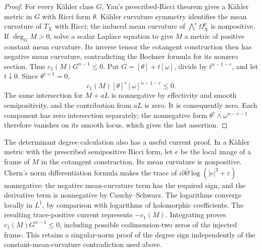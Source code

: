 \begin{proof}
For every Kähler class \(G\), Yau's prescribed-Ricci theorem
\cite{Yau1978} gives a Kähler metric in \(G\) with Ricci form \(\theta\).
Kähler curvature symmetry identifies the mean curvature of \(T_X\)
with Ricci; the induced mean curvature of \(\bigwedge^e\Omega_X^p\)
is nonpositive. If \(\deg_G M>0\), solve a scalar Laplace
equation to give \(M\) a metric of positive constant mean curvature.
Its inverse tensor the cotangent construction then has negative mean
curvature, contradicting the Bochner formula for its nonzero section.
Thus \(c_1(M)G^{n-1}\le0\). Put \(G=[\theta]+t[\omega]\), divide by
\(t^{n-1-r}\), and let \(t\downarrow0\). Since \(\theta^{r+1}=0\),
\[
 c_1(M)[\theta]^r[\omega]^{n-1-r}\le0.
\]
The same intersection for \(M+aL\) is nonnegative by effectivity and
smooth semipositivity, and the contribution from $aL$ is zero. It is
consequently zero. Each component has zero intersection separately;
the nonnegative form $\theta^r\wedge\omega^{n-r-1}$ therefore vanishes
on its smooth locus, which gives the last assertion.
\end{proof}

\begin{remark}
The determinant degree calculation also has a useful current proof. In a K\"ahler metric with the prescribed semipositive Ricci form, let $e$ be the local image of a frame of $M$ in the cotangent construction. Its mean curvature is nonpositive. Chern's norm differentiation formula makes the trace of $i\partial\bar\partial\log(|e|^2+\varepsilon)$ nonnegative: the negative mean-curvature term has the required sign, and the derivative term is nonnegative by Cauchy--Schwarz. The logarithms converge locally in $L^1$, by comparison with logarithms of holomorphic coefficients. The resulting trace-positive current represents $-c_1(M)$. Integrating proves $c_1(M)G^{n-1}\le0$, including possible codimension-two zeros of the injected frame. This retains a singular-norm proof of the degree sign independently of the constant-mean-curvature contradiction used above.
\end{remark}
